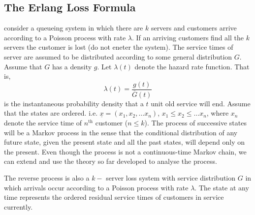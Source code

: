 \documentclass[a4paper,10pt]{article}
\begin{document}
\subsection{The Erlang Loss Formula}
consider a queueing system in which there are $k$ servers and customers arrive according to a Poisson process with rate $\lambda$. If an arriving customers find all the $k$ servers the customer is lost (do not eneter the system). The service times of server are assumed to be distributed according to some general distribution $G$. Assume that $G$ has a density $g$. Let $\lambda(t)$ denote the hazard rate function. That is,
\begin{equation*}
\lambda(t)=\frac{g(t)}{\bar{G}(t)}
\end{equation*}
is the instantaneous probability density that a $t$ unit old service will end. Assume that the states are ordered. i.e. $\underline{x}=(x_1,x_2, \hdots x_n)$, $x_1 \leq x_2 \leq \hdots x_n$, where $x_n$ denote the service time of $n^{\text{th}}$ customer ($n \leq k$). The process of successive states will be a Markov process in the sense that the conditional distribution of any future state, given the present state and all the past states, will depend only on the present. Even though the process is not a continuous-time Markov chain, we can extend and use the theory so far developed to analyse the process.
\begin{cor}
The reverse process is also a $k-$ server loss system with service distribution $G$ in which arrivals occur according to a Poisson process with rate $\lambda$. The state at any time represents the ordered residual service times of customers in service currently.
\end{cor}  
\end{document}
